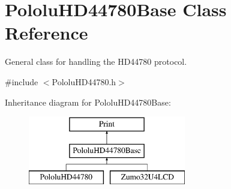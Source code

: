 \hypertarget{class_pololu_h_d44780_base}{}\section{Pololu\+H\+D44780\+Base Class Reference}
\label{class_pololu_h_d44780_base}


General class for handling the H\+D44780 protocol.  




{\ttfamily \#include $<$Pololu\+H\+D44780.\+h$>$}

Inheritance diagram for Pololu\+H\+D44780\+Base\+:\begin{figure}[H]
\begin{center}
\leavevmode
\includegraphics[height=3.000000cm]{class_pololu_h_d44780_base}
\end{center}
\end{figure}

